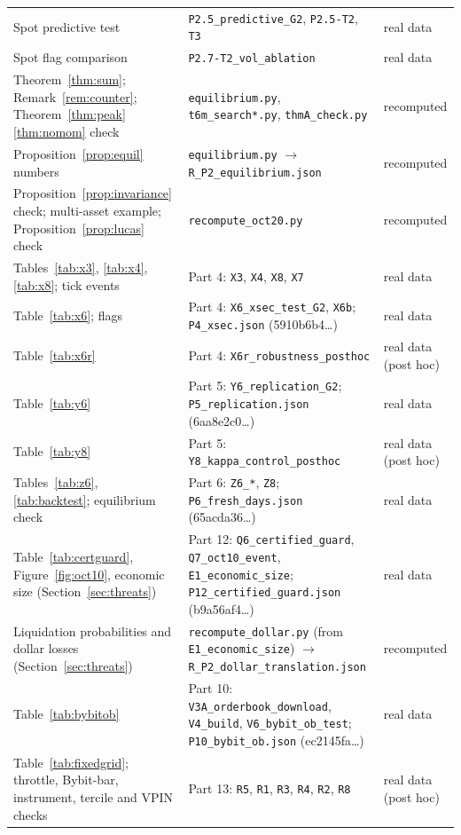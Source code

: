 \begin{longtable}{p{}p{}p{}}
Spot predictive test & \texttt{P2.5\_predictive\_G2}, \texttt{P2.5-T2}, \texttt{T3} & real data\\
Spot flag comparison & \texttt{P2.7-T2\_vol\_ablation} & real data\\
Theorem~\ref{thm:sum}; Remark~\ref{rem:counter}; Theorem~\ref{thm:peak}\ref{thm:nomom} check & \texttt{equilibrium.py}, \texttt{t6m\_search*.py}, \texttt{thmA\_check.py} & recomputed\\
Proposition~\ref{prop:equil} numbers & \texttt{equilibrium.py} $\to$ \texttt{R\_P2\_equilibrium.json} & recomputed\\
Proposition~\ref{prop:invariance} check; multi-asset example; Proposition~\ref{prop:lucas} check & \texttt{recompute\_oct20.py} & recomputed\\
Tables~\ref{tab:x3}, \ref{tab:x4}, \ref{tab:x8}; tick events & Part 4: \texttt{X3}, \texttt{X4}, \texttt{X8}, \texttt{X7} & real data\\
Table~\ref{tab:x6}; flags & Part 4: \texttt{X6\_xsec\_test\_G2}, \texttt{X6b}; \texttt{P4\_xsec.json} (5910b6b4\ldots) & real data\\
Table~\ref{tab:x6r} & Part 4: \texttt{X6r\_robustness\_posthoc} & real data (post hoc)\\
Table~\ref{tab:y6} & Part 5: \texttt{Y6\_replication\_G2}; \texttt{P5\_replication.json} (6aa8e2c0\ldots) & real data\\
Table~\ref{tab:y8} & Part 5: \texttt{Y8\_kappa\_control\_posthoc} & real data (post hoc)\\
Tables~\ref{tab:z6}, \ref{tab:backtest}; equilibrium check & Part 6: \texttt{Z6\_*}, \texttt{Z8}; \texttt{P6\_fresh\_days.json} (65acda36\ldots) & real data\\
Table~\ref{tab:certguard}, Figure~\ref{fig:oct10}, economic size (Section~\ref{sec:threats}) & Part 12: \texttt{Q6\_certified\_guard}, \texttt{Q7\_oct10\_event}, \texttt{E1\_economic\_size}; \texttt{P12\_certified\_guard.json} (b9a56af4\ldots) & real data\\
Liquidation probabilities and dollar losses (Section~\ref{sec:threats}) & \texttt{recompute\_dollar.py} (from \texttt{E1\_economic\_size}) $\to$ \texttt{R\_P2\_dollar\_translation.json} & recomputed\\
Table~\ref{tab:bybitob} & Part 10: \texttt{V3A\_orderbook\_download}, \texttt{V4\_build}, \texttt{V6\_bybit\_ob\_test}; \texttt{P10\_bybit\_ob.json} (ec2145fa\ldots) & real data\\
Table~\ref{tab:fixedgrid}; throttle, Bybit-bar, instrument, tercile and VPIN checks & Part 13: \texttt{R5}, \texttt{R1}, \texttt{R3}, \texttt{R4}, \texttt{R2}, \texttt{R8} & real data (post hoc)\\

\end{longtable}
